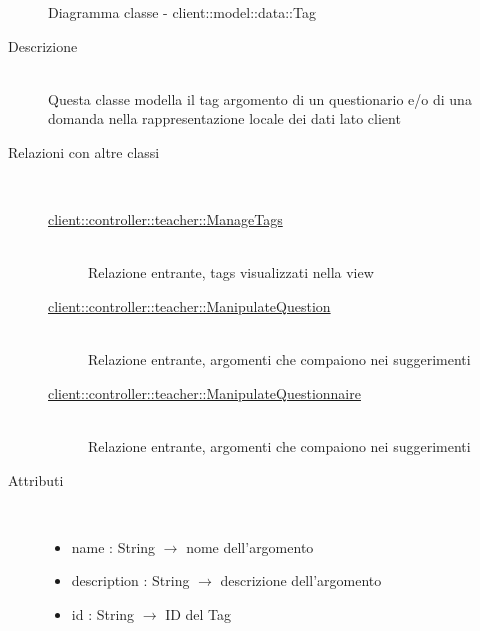 \vspace{0.5cm}
\hypertarget{client::model::data::Tag}{}
\begin{figure}[H]
	\centering
	\caption{Diagramma classe - client::model::data::Tag}
\end{figure}\begin{description}
\item[Descrizione] \hfill \\
Questa classe modella il tag argomento di un questionario e/o di una domanda nella rappresentazione locale dei dati lato client
\item[Relazioni con altre classi] \hfill \\
\vspace{-7mm}
\begin{description}
	\item[\hyperlink{client::controller::teacher::ManageTags}{client::controller::teacher::ManageTags}] \hfill \\
	Relazione entrante, tags visualizzati nella view
	\item[\hyperlink{client::controller::teacher::ManipulateQuestion}{client::controller::teacher::ManipulateQuestion}] \hfill \\
	Relazione entrante, argomenti che compaiono nei suggerimenti
	\item[\hyperlink{client::controller::teacher::ManipulateQuestionnaire}{client::controller::teacher::ManipulateQuestionnaire}] \hfill \\
	Relazione entrante, argomenti che compaiono nei suggerimenti
\end{description}

\item[Attributi] \hfill \\
\vspace{-7mm}
\begin{itemize}
	\item name : String $\rightarrow$ nome dell'argomento
	\item description : String $\rightarrow$ descrizione dell'argomento
	\item id : String $\rightarrow$ ID del Tag
\end{itemize}


\end{description}
